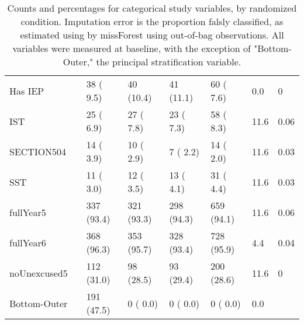 \begin{sidewaystable}[ht]
\begin{tabular}{llllllll}
  Has IEP &  &  38 ( 9.5)  &  40 (10.4)  &  41 (11.1)  &  60 ( 7.6)  &  0.0 & 0 \\ 
  IST &  &  25 ( 6.9)  &  27 ( 7.8)  &  23 ( 7.3)  &  58 ( 8.3)  & 11.6 & 0.06 \\ 
  SECTION504 &  &  14 ( 3.9)  &  10 ( 2.9)  &   7 ( 2.2)  &  14 ( 2.0)  & 11.6 & 0.03 \\ 
  SST &  &  11 ( 3.0)  &  12 ( 3.5)  &  13 ( 4.1)  &  31 ( 4.4)  & 11.6 & 0.03 \\ 
  fullYear5 &  & 337 (93.4)  & 321 (93.3)  & 298 (94.3)  & 659 (94.1)  & 11.6 & 0.06 \\ 
  fullYear6 &  & 368 (96.3)  & 353 (95.7)  & 328 (93.4)  & 728 (95.9)  &  4.4 & 0.04 \\ 
  noUnexcused5 &  & 112 (31.0)  &  98 (28.5)  &  93 (29.4)  & 200 (28.6)  & 11.6 & 0 \\ 
   \hline
Bottom-Outer &  & 191 (47.5)  &   0 ( 0.0)  &   0 ( 0.0)  &   0 ( 0.0)  &  0.0 &  \\ 
   \hline
\end{tabular}
\caption{Counts and percentages for categorical study variables, by randomized condition. Imputation error is the proportion falsly classified, as estimated using by missForest using out-of-bag observations. All variables were measured at baseline, with the exception of "Bottom-Outer," the principal stratification variable.} 
\label{table:tab1fac}
\end{sidewaystable}
